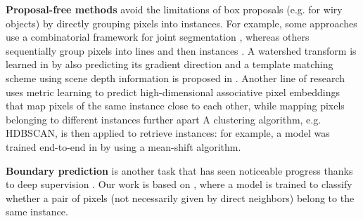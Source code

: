 \textbf{Proposal-free methods} avoid the limitations of box proposals (e.g. for wiry objects) by directly grouping pixels into instances. For example, some approaches use a combinatorial framework for joint segmentation \cite{kirillov2017instancecut}, whereas others sequentially group pixels into lines and then instances \cite{liu2017sgn}.
A watershed transform is learned in \cite{bai2017deep} by also predicting its gradient direction and a template matching scheme using scene depth information is proposed in \cite{uhrig2016pixel}.
Another line of research uses metric learning to predict high-dimensional associative pixel embeddings that map pixels of the same instance close to each other, while mapping pixels belonging to different instances further apart \cite{fathi2017semantic,newell2017associative,de2017semantic,novotny2018semi,kulikov2018instance} 
A clustering algorithm, e.g. HDBSCAN, is then applied to retrieve instances: for example, a model was trained end-to-end in \cite{kong2018recurrent} by using a mean-shift algorithm.

\textbf{Boundary prediction} is another task that has seen noticeable progress thanks to deep supervision \cite{xie2015holistically,kokkinos2015pushing}. 
Our work is based on \cite{liu2018affinity}, where a model is trained to classify whether a pair of pixels (not necessarily given by direct neighbors) belong to the same instance. 

